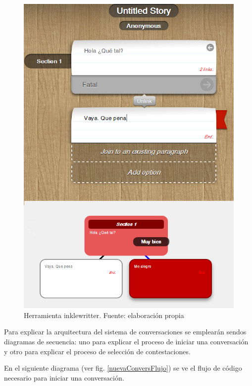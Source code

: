 \begin{figure}
\begin{center}
\includegraphics[scale=0.7]{imagenes/inklewritter.png}
\caption{Herramienta inklewritter. Fuente: elaboración propia}
\label{inklewritter}
\end{center}
\end{figure}

Para explicar la arquitectura del sistema de conversaciones se emplearán sendos diagramas de secuencia: uno para explicar el proceso de iniciar una conversación y otro para explicar el proceso de selección de contestaciones.

En el siguiente diagrama (ver fig. \ref{nuevaConversFlujo}) se ve el flujo de código necesario para iniciar una conversación. 


